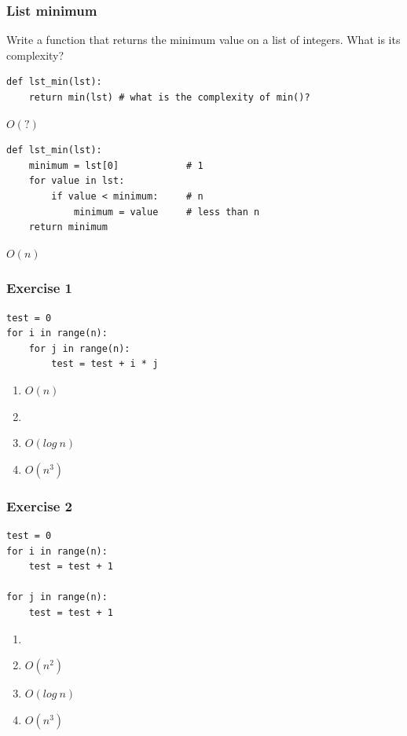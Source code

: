 \documentclass[11pt]{beamer}
\begin{document}
\begin{frame}\frametitle{List minimum}
\begin{block}{}
Write a function that returns the minimum value on a list of integers. What is its complexity?
\end{block}
\framebreak
\begin{lstlisting}
def lst_min(lst):
	return min(lst) # what is the complexity of min()?
\end{lstlisting}
\begin{block}{}
\centering $O(?)$
\end{block}
\framebreak
\begin{lstlisting}
def lst_min(lst):
	minimum = lst[0]			# 1
	for value in lst:
		if value < minimum:		# n
			minimum = value		# less than n
	return minimum
\end{lstlisting}
\begin{block}{}
\centering $O(n)$
\end{block}
\end{frame}



\begin{frame}[fragile]\frametitle{Exercise 1}
\begin{lstlisting}
test = 0
for i in range(n):
	for j in range(n):
		test = test + i * j
\end{lstlisting}
\begin{enumerate}
\item $O(n)$
\item {}
\item $O(log\ n)$
\item $O(n^3)$
\end{enumerate}
\end{frame}

\begin{frame}[fragile]\frametitle{Exercise 2}
\begin{lstlisting}
test = 0
for i in range(n):
	test = test + 1
	
for j in range(n):
	test = test + 1
\end{lstlisting}
\begin{enumerate}
\item {}
\item $O(n^2)$
\item $O(log\ n)$
\item $O(n^3)$
\end{enumerate}
\end{frame}
\end{document}
